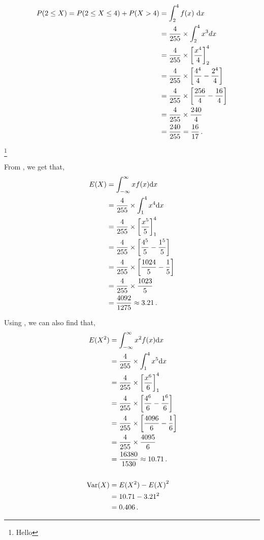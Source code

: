 \begin{subquestions}
\begin{subsubquestions}
\begin{align}
	P(2 \leq X) = P(2 \leq X \leq 4) + P(X>4) & = \int_2^4 f(x)~\mathrm{d}x \nonumber \\
	                                 & = \frac{4}{255} \times \int_2^4 x^3{d}x \nonumber \\
	                                 & = \frac{4}{255} \times \left[\frac{x^4}{4}\right]^4_2 \nonumber \\
	                                 & = \frac{4}{255} \times \left[\frac{4^4}{4}-\frac{2^4}{4}\right] \nonumber \\
	                                 & = \frac{4}{255} \times \left[\frac{256}{4}-\frac{16}{4}\right] \nonumber \\
	                                 & = \frac{4}{255} \times \frac{240}{4} \nonumber \\
	                                 & = \frac{240}{255} = \frac{16}{17} \,.
\end{align}
	
\footnote{Hello}

\subsubquestion

From , we get that,
\begin{align}
	E(X) & = \int_{-\infty}^{\infty} x f(x)\mathrm{d}x \nonumber \\
	     & = \frac{4}{255} \times \int_{1}^{4} x^4 \mathrm{d}x \nonumber \\
	     & = \frac{4}{255} \times \left[\frac{x^5}{5}\right]^4_1 \nonumber \\
	     & = \frac{4}{255} \times \left[\frac{4^5}{5} - \frac{1^5}{5}\right] \nonumber \\
	     & = \frac{4}{255} \times \left[\frac{1024}{5} - \frac{1}{5}\right] \nonumber \\
	     & = \frac{4}{255} \times \frac{1023}{5} \nonumber \\
	     & = \frac{4092}{1275} \approx 3.21 \,. 
\end{align}

Using , we can also find that,
\begin{align}
	E(X^2) & = \int_{-\infty}^{\infty} x^2 f(x)\mathrm{d}x \nonumber \\
	& = \frac{4}{255} \times \int_{1}^{4} x^5 \mathrm{d}x \nonumber \\
	& = \frac{4}{255} \times \left[\frac{x^6}{6}\right]^4_1 \nonumber \\
	& = \frac{4}{255} \times \left[\frac{4^6}{6} - \frac{1^6}{6}\right] \nonumber \\
	& = \frac{4}{255} \times \left[\frac{4096}{6} - \frac{1}{6}\right] \nonumber \\
	& = \frac{4}{255} \times \frac{4095}{6} \nonumber \\
	& = \frac{16380}{1530} \approx 10.71 \,. \\ \nonumber \\
	\text{Var}(X) & = E(X^2) - {E(X)}^2 \nonumber \\
	              & = 10.71 - 3.21^2 \nonumber \\
	              & = 0.406 \,.	
\end{align}


\end{subsubquestions}
\end{subquestions}
